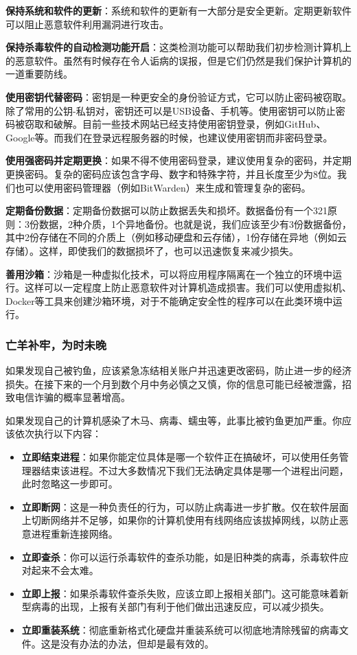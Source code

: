 \textbf{保持系统和软件的更新}：系统和软件的更新有一大部分是安全更新。定期更新软件可以阻止恶意软件利用漏洞进行攻击。

\textbf{保持杀毒软件的自动检测功能开启}：这类检测功能可以帮助我们初步检测计算机上的恶意软件。虽然有时候存在令人诟病的误报，但是它们仍然是我们保护计算机的一道重要防线。

\textbf{使用密钥代替密码}：密钥是一种更安全的身份验证方式，它可以防止密码被窃取。除了常用的公钥-私钥对，密钥还可以是USB设备、手机等。使用密钥可以防止密码被窃取和破解。目前一些技术网站已经支持使用密钥登录，例如GitHub、Google等。而我们在登录远程服务器的时候，也建议使用密钥而非密码登录。

\textbf{使用强密码并定期更换}：如果不得不使用密码登录，建议使用复杂的密码，并定期更换密码。复杂的密码应该包含字母、数字和特殊字符，并且长度至少为8位。我们也可以使用密码管理器（例如BitWarden）来生成和管理复杂的密码。

\textbf{定期备份数据}：定期备份数据可以防止数据丢失和损坏。数据备份有一个321原则：3份数据，2种介质，1个异地备份。也就是说，我们应该至少有3份数据备份，其中2份存储在不同的介质上（例如移动硬盘和云存储），1份存储在异地（例如云存储）。这样，即使我们的数据损坏了，也可以迅速恢复来减少损失。

\textbf{善用沙箱}：沙箱是一种虚拟化技术，可以将应用程序隔离在一个独立的环境中运行。这样可以一定程度上防止恶意软件对计算机造成损害。我们可以使用虚拟机、Docker等工具来创建沙箱环境，对于不能确定安全性的程序可以在此类环境中运行。

\subsubsection{亡羊补牢，为时未晚}

如果发现自己被钓鱼，应该紧急冻结相关账户并迅速更改密码，防止进一步的经济损失。在接下来的一个月到数个月中务必慎之又慎，你的信息可能已经被泄露，招致电信诈骗的概率显著增高。

如果发现自己的计算机感染了木马、病毒、蠕虫等，此事比被钓鱼更加严重。你应该依次执行以下内容：

\begin{itemize}
  \item \textbf{立即结束进程}：如果你能定位具体是哪一个软件正在搞破坏，可以使用任务管理器结束该进程。不过大多数情况下我们无法确定具体是哪一个进程出问题，此时忽略这一步即可。
  \item \textbf{立即断网}：这是一种负责任的行为，可以防止病毒进一步扩散。仅在软件层面上切断网络并不足够，如果你的计算机使用有线网络应该拔掉网线，以防止恶意进程重新连接网络。
  \item \textbf{立即查杀}：你可以运行杀毒软件的查杀功能，如是旧种类的病毒，杀毒软件应对起来不会太难。
  \item \textbf{立即上报}：如果杀毒软件查杀失败，应该立即上报相关部门。这可能意味着新型病毒的出现，上报有关部门有利于他们做出迅速反应，可以减少损失。
  \item \textbf{立即重装系统}：彻底重新格式化硬盘并重装系统可以彻底地清除残留的病毒文件。这是没有办法的办法，但却是最有效的。
\end{itemize}

